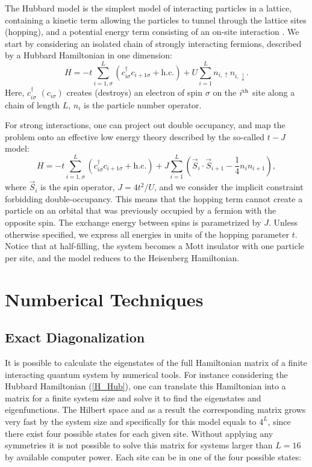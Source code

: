 \documentclass[article,11pt]{revtex4}
\begin{document}
The Hubbard model is the simplest model of interacting particles in a lattice, containing a kinetic term allowing the particles to tunnel through the lattice sites (hopping), and a potential energy term consisting of an on-site interaction \cite{J_Hubbard1963}.  We start by considering an isolated chain of strongly interacting fermions, described by a Hubbard Hamiltonian in one dimension:
\begin{equation}
H=-t \sum_{i=1,\sigma}^L \left(c^\dagger_{i\sigma} c_{i+1\sigma}+\mathrm{h.c.}\right)
+ U \sum_{i=1}^L n_{i,\uparrow} n_{i,\downarrow}.
\label{H_Hub}
\end{equation}
Here, $c^\dagger_{i\sigma}$ $(c_{i\sigma})$ creates (destroys) an electron of spin $\sigma$ on the
$i^{\rm th}$ site along a chain of length $L$, $n_i$ is the particle number operator.

For strong interactions, one can project out double occupancy, and map the problem onto an effective low energy theory described by the so-called $t-J$ model:
\begin{equation}
H=-t \sum_{i=1,\sigma}^L \left(c^\dagger_{i\sigma} c_{i+1\sigma}+\mathrm{h.c.}\right)
+ J \sum_{i=1}^L (\vec{S}_i \cdot \vec{S}_{i+1} -\frac{1}{4} n_i n_{i+1} ),
\label{H_t-J}
\end{equation}
where $\vec{S}_i$ is the spin operator, $J=4t^2/U$, and we consider the implicit constraint forbidding double-occupancy. This means that the hopping term cannot create a particle on an orbital that was previously occupied by a fermion with the opposite spin. 
 The exchange energy between spins is parametrized by $J$. Unless otherwise specified, we express all energies in units of the hopping parameter $t$. Notice that at half-filling, the system becomes a Mott insulator with one particle per site, and the model reduces to the Heisenberg Hamiltonian.

\pagebreak
\section {Numberical Techniques}

\subsection {Exact Diagonalization}

It is possible to calculate the eigenstates of the full Hamiltonian matrix of a finite interacting quantum system by numerical tools. For instance considering the Hubbard Hamiltonian (\ref{H_Hub}), one can translate this Hamiltonian into a matrix for a finite system size and solve it to find the eigenstates and eigenfunctions. The Hilbert space and as a result the corresponding matrix grows very fast by the system size and specifically for this model equals to $4^L$, since there exist four possible states for each given site. Without applying any symmetries it is not possible to solve this matrix for systems larger than $L=16$ by available computer power. Each site can be in one of the four possible states:
\end{document}
